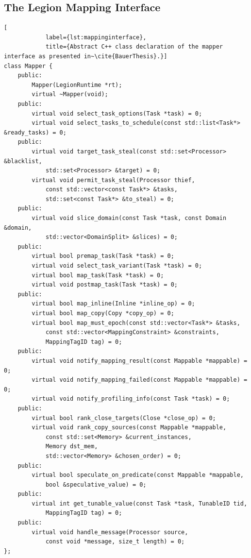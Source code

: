 \documentclass{article}      %
\begin{document}
\begin{appendices}
	\section{The Legion Mapping Interface}
		\label{app:mappinginterface}

		\begin{lstlisting}[
			label={lst:mappinginterface},
			title={Abstract C++ class declaration of the mapper interface as presented in~\cite{BauerThesis}.}]
class Mapper {
	public:
		Mapper(LegionRuntime *rt);
		virtual ~Mapper(void);
	public:
		virtual void select_task_options(Task *task) = 0;
		virtual void select_tasks_to_schedule(const std::list<Task*> &ready_tasks) = 0;
	public:
		virtual void target_task_steal(const std::set<Processor> &blacklist,
			std::set<Processor> &target) = 0;
		virtual void permit_task_steal(Processor thief,
			const std::vector<const Task*> &tasks,
			std::set<const Task*> &to_steal) = 0;
	public:
		virtual void slice_domain(const Task *task, const Domain &domain,
			std::vector<DomainSplit> &slices) = 0;
	public:
		virtual bool premap_task(Task *task) = 0;
		virtual void select_task_variant(Task *task) = 0;
		virtual bool map_task(Task *task) = 0;
		virtual void postmap_task(Task *task) = 0;
	public:
		virtual bool map_inline(Inline *inline_op) = 0;
		virtual bool map_copy(Copy *copy_op) = 0;
		virtual bool map_must_epoch(const std::vector<Task*> &tasks,
			const std::vector<MappingConstraint> &constraints,
			MappingTagID tag) = 0;
	public:
		virtual void notify_mapping_result(const Mappable *mappable) = 0;
		virtual void notify_mapping_failed(const Mappable *mappable) = 0;
		virtual void notify_profiling_info(const Task *task) = 0;
	public:
		virtual bool rank_close_targets(Close *close_op) = 0;
		virtual void rank_copy_sources(const Mappable *mappable,
			const std::set<Memory> &current_instances,
			Memory dst_mem, 
			std::vector<Memory> &chosen_order) = 0;
	public:
		virtual bool speculate_on_predicate(const Mappable *mappable,
			bool &speculative_value) = 0;
	public:
		virtual int get_tunable_value(const Task *task, TunableID tid,
			MappingTagID tag) = 0;
	public:
		virtual void handle_message(Processor source, 
			const void *message, size_t length) = 0;
};
\end{lstlisting}
	

\end{appendices}
\end{document}
